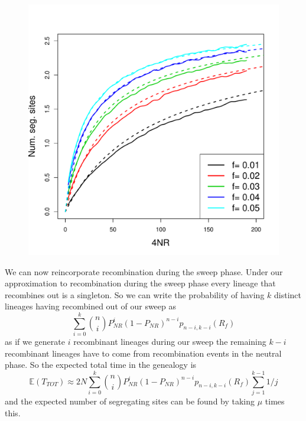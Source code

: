 \documentclass[a4paper,10pt]{article}
\begin{document}
\begin{figure}
\includegraphics[width = 0.8
          \textwidth]{Paper_Figures/segsite_density.pdf}
\end{figure}

We can now reincorporate recombination during the sweep phase. Under our approximation to recombination during the sweep phase every lineage that recombines out is a singleton. So we can write the probability of having $k$ distinct lineages having recombined out of our sweep as
\begin{equation}
\sum_{i=0}^{k} {n \choose i} P_{NR}^{i} (1-P_{NR})^{n-i} p_{n-i,k-i}(R_f)
\end{equation}
as if we generate $i$ recombinant lineages during our sweep the remaining $k-i$ recombinant lineages have to come from recombination events in the neutral phase. So the expected total time in the genealogy is 
\begin{equation}
\mathbb{E}(T_{TOT})  \approx 2N \sum_{i=0}^{k} {n \choose i} P_{NR}^{i} (1-P_{NR})^{n-i} p_{n-i,k-i}(R_f)   \sum_{j=1}^{k-1} 1/j
\end{equation}
and the expected number of segregating sites can be found by taking $\mu$ times this. 
\end{document}
